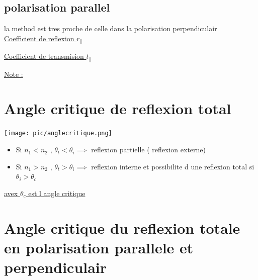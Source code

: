 \documentclass[12pt]{book}
\begin{document}
            \subsection{polarisation parallel}
                la method est tres proche de celle dans la polarisation perpendiculair \\
                \underline{Coefficient de reflexion $r_\parallel$}
                \begin{center}
                \end{center}
                \underline{Coefficient de transmision $t_\parallel$}
                \begin{center}
                \end{center}
                \underline{Note :} \\
                \begin{center}
                \end{center}
                
        \section{Angle critique de reflexion total}
            \texttt{[image: pic/anglecritique.png]}
            \begin{itemize}
                \item Si $n_1 < n_2$ , $\theta_t < \theta_i \implies $ reflexion partielle ( reflexion externe)
                \item Si $n_1 > n_2$ , $\theta_t > \theta_i \implies $ reflexion interne et possibilite d une reflexion total si $\theta_i > \theta_c$
            \end{itemize}
            \underline{avex $\theta_c$ est l angle critique}
        \section{Angle critique du reflexion totale en polarisation parallele et perpendiculair}
\end{document}
